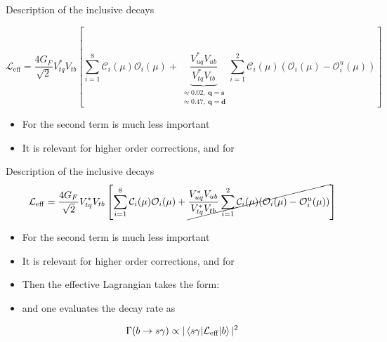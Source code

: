 \documentclass[xcolor=dvipsnames]{beamer}
\begin{document}
\begin{frame}{Description of the inclusive decays}
   \scriptsize

   \begin{equation}\nonumber
      \mathcal{L}_{\mathrm{eff}} = \frac{4G_F}{\sqrt{2}}V_{tq}^*V_{tb}\left[\sum^{8}_{i=1}\mathcal{C}_i(\mu)\mathcal{O}_i(\mu)
                                                  + {\underbrace{\frac{V^*_{uq}V_{ub}}{V^*_{tq}V_{tb}}}_{\substack{\approx 0.02,~\mathbf{q = s}\\\approx 0.47,~\mathbf{q = d}}}}\sum^{2}_{i=1}\mathcal{C}_i(\mu)(\mathcal{O}_i(\mu)-\mathcal{O}_i^u(\mu))\right]
   \end{equation}

\begin{itemize}
   \item For \btosgamma the second term is much less important
   \item It is relevant for higher order corrections, and for \btodgamma
\end{itemize}

\end{frame}

\begin{frame}{Description of the inclusive decays}
\scriptsize
   \begin{equation}\nonumber
      \mathcal{L}_{\mathrm{eff}} = \frac{4G_F}{\sqrt{2}}V_{tq}^*V_{tb}\left[\sum^{8}_{i=1}\mathcal{C}_i(\mu)\mathcal{O}_i(\mu)
                                                  + \cancel{\frac{V^*_{uq}V_{ub}}{V^*_{tq}V_{tb}}\sum^{2}_{i=1}\mathcal{C}_i(\mu)(\mathcal{O}_i(\mu)-\mathcal{O}_i^u(\mu))}\right]
   \end{equation}

\begin{itemize}
   \item For \btosgamma the second term is much less important
   \item It is relevant for higher order corrections, and for \btodgamma
   \item[\ra] Then the effective Lagrangian takes the form:
\end{itemize}

\vspace{-15pt}



\begin{itemize}
   \item and one evaluates the decay rate as 
\end{itemize}

\vspace{-10pt}

\begin{equation}\nonumber
   \Gamma({b\rightarrow s\gamma})\propto|\mel**{s\gamma}{\mathcal{L}_{\mathrm{eff}}}{b}|^2
\end{equation}

\end{frame}
\end{document}
